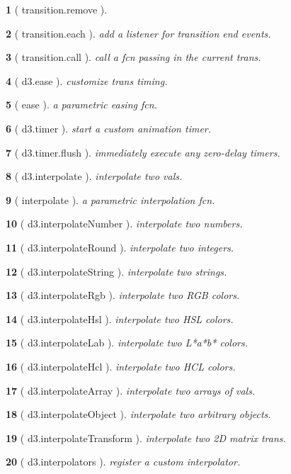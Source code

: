 \documentclass[10pt,landscape,letterpaper]{article}
\newcounter{thm}
\newcommand{\hdrule}{\vspace{-4pt} \hdashrule[0.25ex]{\fill}{.5pt}{1pt}\vspace{-4pt}}
\theoremstyle{mytheoremstyle}
\newtheorem*{thm}{}
\begin{document}
\begin{multicols}{3}
\begin{thm} [ transition.remove ]
\end{thm}\begin{thm} [ transition.each ]  add a listener for transition end events.
\end{thm}\begin{thm} [ transition.call ]  call a fcn passing in the current trans.
\end{thm}\begin{thm} [ d3.ease ]  customize trans timing.
\end{thm}\begin{thm} [ ease ]  a parametric easing fcn.
\end{thm}\begin{thm} [ d3.timer ]  start a custom animation timer.
\end{thm}\begin{thm} [ d3.timer.flush ]  immediately execute any zero-delay timers.
\end{thm}\begin{thm} [ d3.interpolate ]  interpolate two vals.
\end{thm}\begin{thm} [ interpolate ]  a parametric interpolation fcn.
\end{thm}\begin{thm} [ d3.interpolateNumber ]  interpolate two numbers.
\end{thm}\begin{thm} [ d3.interpolateRound ]  interpolate two integers.
\end{thm}\begin{thm} [ d3.interpolateString ]  interpolate two strings.
\end{thm}\begin{thm} [ d3.interpolateRgb ]  interpolate two RGB colors.
\end{thm}\begin{thm} [ d3.interpolateHsl ]  interpolate two HSL colors.
\end{thm}\begin{thm} [ d3.interpolateLab ]  interpolate two L*a*b* colors.
\end{thm}\begin{thm} [ d3.interpolateHcl ]  interpolate two HCL colors.
\end{thm}\begin{thm} [ d3.interpolateArray ]  interpolate two arrays of vals.
\end{thm}\begin{thm} [ d3.interpolateObject ]  interpolate two arbitrary objects.
\end{thm}\begin{thm} [ d3.interpolateTransform ]  interpolate two 2D matrix trans.
\end{thm}\begin{thm} [ d3.interpolators ]  register a custom interpolator.\end{thm}
\hdrule

\end{multicols}
\end{document}
